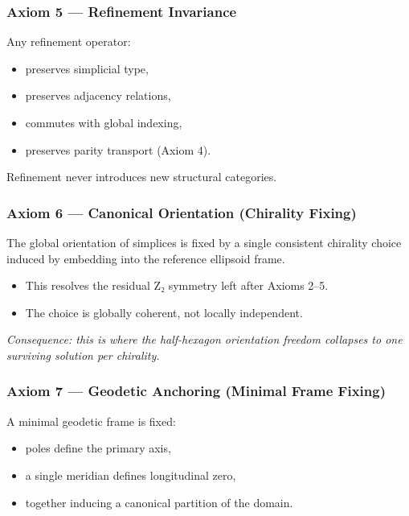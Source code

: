 \documentclass[
  11pt,
  a4paper,
]{article}
\providecommand{\tightlist}{%
  \setlength{\itemsep}{0pt}\setlength{\parskip}{0pt}}
\begin{document}
\subsubsection{Axiom 5 --- Refinement
Invariance}\label{axiom-5-refinement-invariance}

Any refinement operator:

\begin{itemize}
\tightlist
\item
  preserves simplicial type,
\item
  preserves adjacency relations,
\item
  commutes with global indexing,
\item
  preserves parity transport (Axiom 4).
\end{itemize}

Refinement never introduces new structural categories.

\subsubsection{Axiom 6 --- Canonical Orientation (Chirality
Fixing)}\label{axiom-6-canonical-orientation-chirality-fixing}

The global orientation of simplices is fixed by a single consistent
chirality choice induced by embedding into the reference ellipsoid
frame.

\begin{itemize}
\tightlist
\item
  This resolves the residual Z₂ symmetry left after Axioms 2--5.
\item
  The choice is globally coherent, not locally independent.
\end{itemize}

\emph{Consequence: this is where the half-hexagon orientation freedom
collapses to one surviving solution per chirality.}

\subsubsection{Axiom 7 --- Geodetic Anchoring (Minimal Frame
Fixing)}\label{axiom-7-geodetic-anchoring-minimal-frame-fixing}

A minimal geodetic frame is fixed:

\begin{itemize}
\tightlist
\item
  poles define the primary axis,
\item
  a single meridian defines longitudinal zero,
\item
  together inducing a canonical partition of the domain.
\end{itemize}
\end{document}
